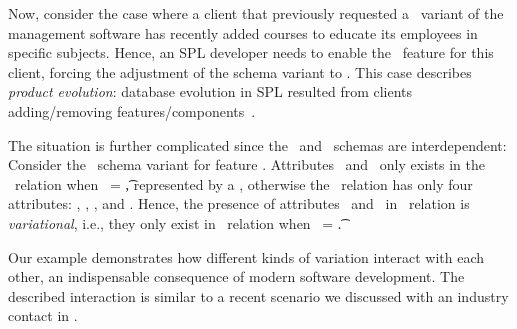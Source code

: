 Now, consider the case where a client that previously requested a \basic\ variant of the
management software has recently added courses to educate its
employees in specific subjects. Hence, an SPL developer needs to enable
the \edu\ feature for this client, forcing the adjustment of the schema variant to \educational. 
This case describes \emph{product evolution}:
database evolution in SPL resulted
from clients adding/removing features/components~\cite{dbSPLevolve}. 

The situation is further complicated since the \basic\ and \educational\ schemas are interdependent:
Consider
the \basic\ schema 
variant for feature \vFour. Attributes \isstudent\ and \isteacher\ only exists
in the \empacct\ relation when \edu\ = \t, represented by a ,
otherwise the \empacct\
relation has only four attributes: \empno, \hiredate, \titleatt, and \deptno.
Hence, the presence of attributes \isstudent\ and \isteacher\ in \empacct\ relation is
\emph{variational}, i.e., they only exist in \empacct\ relation
when \edu\ = \t.


Our example demonstrates how different kinds of variation
interact with each other, an indispensable consequence of modern software
development.
The described interaction is similar to a recent scenario we discussed with an
industry contact in \secref{industryex}.

